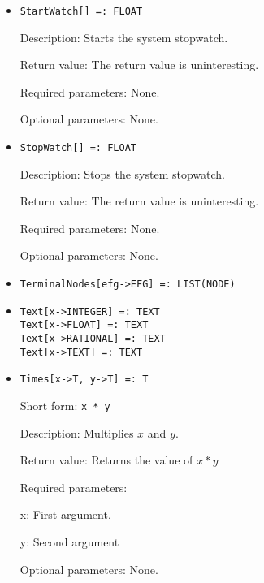\begin{itemize}
\item

\protect \large \begin{verbatim}
StartWatch[] =: FLOAT
\end{verbatim}\normalsize

\bd
\item
[Description:] Starts the system stopwatch.
\item
[Return value:] The return value is uninteresting.
\item
[Required parameters:] None.
\item
[Optional parameters:] None.
\ed

\item
\protect \large \begin{verbatim}
StopWatch[] =: FLOAT
\end{verbatim}\normalsize

\bd
\item
[Description:] Stops the system stopwatch.
\item
[Return value:] The return value is uninteresting.
\item
[Required parameters:] None.
\item
[Optional parameters:] None.
\ed


\item
\protect \large \begin{verbatim} 
TerminalNodes[efg->EFG] =: LIST(NODE)
\end{verbatim}\normalsize

\item
\protect \large \begin{verbatim}
Text[x->INTEGER] =: TEXT
Text[x->FLOAT] =: TEXT
Text[x->RATIONAL] =: TEXT
Text[x->TEXT] =: TEXT
\end{verbatim} \normalsize

\item 
\protect \large \begin{verbatim}
Times[x->T, y->T] =: T
\end{verbatim} \normalsize
  
\bd
\item
[Short form:] \verb+x * y+
\item
[Description:] Multiplies $x$ and $y$.
\item
[Return value:] Returns the value of $x * y$  
\item
[Required parameters:]\hfil\null
\bd
\item
[x:] First argument.  
\item
[y:] Second argument
\ed
\item
[Optional parameters:] None.
\ed


\end{itemize}
